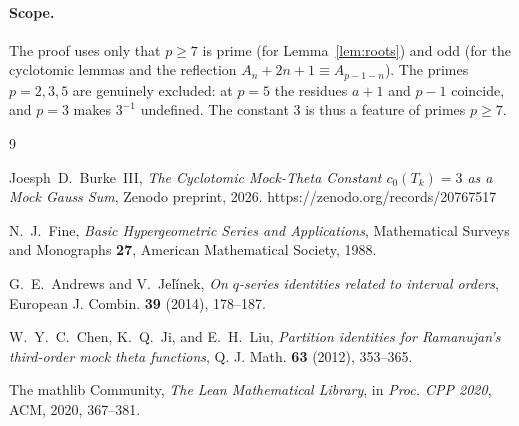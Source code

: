 \documentclass[11pt]{article}
\theoremstyle{definition}
\begin{document}
\paragraph{Scope.}
The proof uses only that $p\ge 7$ is prime (for Lemma~\ref{lem:roots}) and odd (for the cyclotomic lemmas and the reflection $A_n+2n+1\equiv A_{p-1-n}$). The primes $p=2,3,5$ are genuinely excluded: at $p=5$ the residues $a+1$ and $p-1$ coincide, and $p=3$ makes $3^{-1}$ undefined. The constant $3$ is thus a feature of primes $p\ge7$.

\begin{thebibliography}{9}

Joesph~D.~Burke~III,
\emph{The Cyclotomic Mock-Theta Constant $c_0(T_k)=3$ as a Mock Gauss Sum},
Zenodo preprint, 2026. https://zenodo.org/records/20767517

N.~J.~Fine,
\emph{Basic Hypergeometric Series and Applications},
Mathematical Surveys and Monographs \textbf{27}, American Mathematical Society, 1988.

G.~E.~Andrews and V.~Je\v{l}\'{i}nek,
\emph{On $q$-series identities related to interval orders},
European J. Combin. \textbf{39} (2014), 178--187.

W.~Y.~C.~Chen, K.~Q.~Ji, and E.~H.~Liu,
\emph{Partition identities for Ramanujan's third-order mock theta functions},
Q. J. Math. \textbf{63} (2012), 353--365.

The mathlib Community,
\emph{The Lean Mathematical Library},
in \emph{Proc. CPP 2020}, ACM, 2020, 367--381.

\end{thebibliography}
\end{document}
